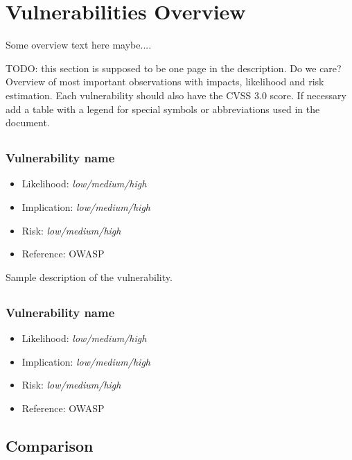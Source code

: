 \chapter{Vulnerabilities Overview}\label{chapter:vulnerabilities_overview}
Some overview text here maybe.... \newline

TODO: this section is supposed to be one page in the description. Do we care?\newline
Overview of most important observations with impacts, likelihood and risk estimation.
Each vulnerability should also have the CVSS 3.0 score. If necessary add a table with a legend for
special symbols or abbreviations used in the document.\newline

\section{\bs}
\subsection{Vulnerability name} \label{over:their_test}
\begin{itemize}
	\item Likelihood: \textit{low/medium/high}
	\item Implication: \textit{low/medium/high}
	\item Risk: \textit{low/medium/high}
	\item Reference: OWASP 
\end{itemize}
Sample description of the vulnerability.

\section{\gnb}
\subsection{Vulnerability name} \label{over:our_test}
\begin{itemize}
	\item Likelihood: \textit{low/medium/high}
	\item Implication: \textit{low/medium/high}
	\item Risk: \textit{low/medium/high}
	\item Reference: OWASP 
\end{itemize}
	
\section{Comparison}


